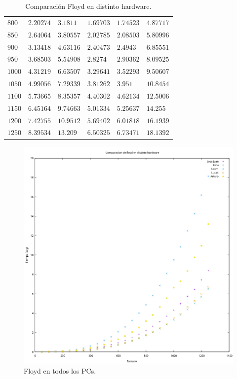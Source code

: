 \documentclass[12pt]{article}
\begin{document}
\begin{table}
\begin{tabular}{|l|l|l|l|l|l|}
            $800$ & $2.20274$ & $3.1811$ & $1.69703$ & $1.74523$ & $4.87717$ \\
            $850$ & $2.64064$ & $3.80557$ & $2.02785$ & $2.08503$ & $5.80996$ \\
            $900$ & $3.13418$ & $4.63116$ & $2.40473$ & $2.4943$ & $6.85551$ \\
            $950$ & $3.68503$ & $5.54908$ & $2.8274$ & $2.90362$ & $8.09525$ \\
            $1000$ & $4.31219$ & $6.63507$ & $3.29641$ & $3.52293$ & $9.50607$ \\
            $1050$ & $4.99056$ & $7.29339$ & $3.81262$ & $3.951$ & $10.8454$ \\
            $1100$ & $5.73665$ & $8.35357$ & $4.40302$ & $4.62134$ & $12.5006$ \\
            $1150$ & $6.45164$ & $9.74663$ & $5.01334$ & $5.25637$ & $14.255$ \\
            $1200$ & $7.42755$ & $10.9512$ & $5.69402$ & $6.01818$ & $16.1939$ \\
            $1250$ & $8.39534$ & $13.209$ & \underline{$6.50325$} & $6.73471$ & \underline{$18.1392$} \\
            \hline
        \end{tabular}
        \caption{Comparación Floyd en distinto hardware.}
        \label{tab:comp_hardware_floyd}
    \end{table}
    \begin{figure}
        \centering
        \includegraphics[width=\linewidth]{images/Comparaciones_hardware/Comparacion_hardware_floyd.png}
        \caption{Floyd en todos los PCs.}
        \label{fig:CompHardwareFloyd}
    \end{figure}
\end{document}
